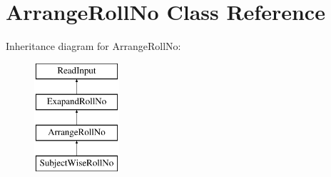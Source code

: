 \hypertarget{classArrangeRollNo}{\section{Arrange\-Roll\-No Class Reference}
\label{classArrangeRollNo}
}
Inheritance diagram for Arrange\-Roll\-No\-:\begin{figure}[H]
\begin{center}
\leavevmode
\includegraphics[height=4.000000cm]{classArrangeRollNo}
\end{center}
\end{figure}
